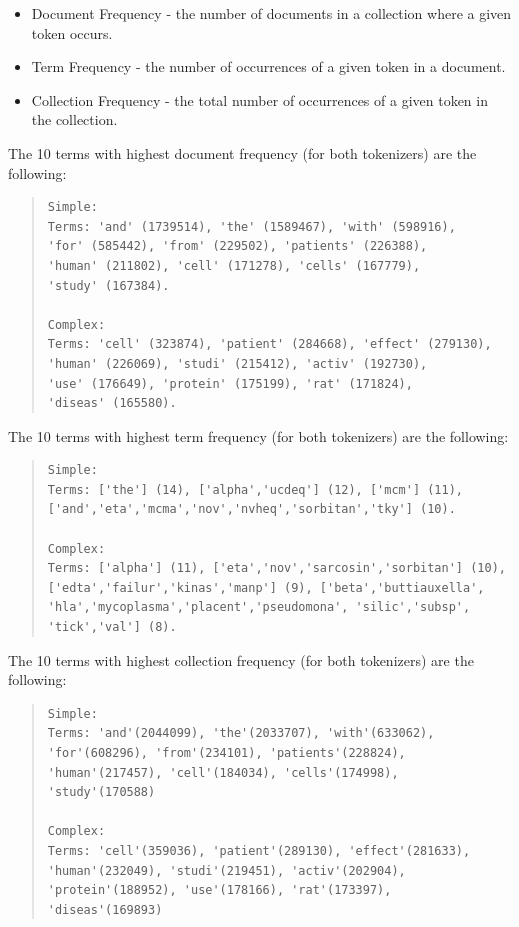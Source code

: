 \documentclass[12pt]{article}
\begin{document}
\begin{itemize}[leftmargin=*]
\setlength\itemsep{-0.3em}
\item Document Frequency - the number of documents in a collection where 
a given token occurs.
\item Term Frequency - the number of occurrences of a given token in a 
document.
\item Collection Frequency - the total number of occurrences of a given 
token in the collection.
\end{itemize}

The 10 terms with highest document frequency (for both tokenizers) are the 
following:

\begingroup
\addtolength\leftmargini{-0.4in}
\addtolength\baselineskip{-0.05in}
\begin{quote}
\begin{verbatim}
Simple:
Terms: 'and' (1739514), 'the' (1589467), 'with' (598916), 
'for' (585442), 'from' (229502), 'patients' (226388), 
'human' (211802), 'cell' (171278), 'cells' (167779), 
'study' (167384).

Complex:
Terms: 'cell' (323874), 'patient' (284668), 'effect' (279130),
'human' (226069), 'studi' (215412), 'activ' (192730),
'use' (176649), 'protein' (175199), 'rat' (171824),
'diseas' (165580).
\end{verbatim}
\end{quote}
\endgroup

The 10 terms with highest term frequency (for both tokenizers) are the 
following:

\begingroup
\addtolength\leftmargini{-0.4in}
\addtolength\baselineskip{-0.05in}
\begin{quote}
\begin{verbatim}
Simple:
Terms: ['the'] (14), ['alpha','ucdeq'] (12), ['mcm'] (11),
['and','eta','mcma','nov','nvheq','sorbitan','tky'] (10).

Complex:
Terms: ['alpha'] (11), ['eta','nov','sarcosin','sorbitan'] (10),
['edta','failur','kinas','manp'] (9), ['beta','buttiauxella',
'hla','mycoplasma','placent','pseudomona', 'silic','subsp',
'tick','val'] (8).
\end{verbatim}
\end{quote}
\endgroup

The 10 terms with highest collection frequency (for both tokenizers) are the 
following:

\begingroup
\addtolength\leftmargini{-0.4in}
\addtolength\baselineskip{-0.05in}
\begin{quote}
\begin{verbatim}
Simple:
Terms: 'and'(2044099), 'the'(2033707), 'with'(633062), 
'for'(608296), 'from'(234101), 'patients'(228824),
'human'(217457), 'cell'(184034), 'cells'(174998),
'study'(170588)

Complex:
Terms: 'cell'(359036), 'patient'(289130), 'effect'(281633),
'human'(232049), 'studi'(219451), 'activ'(202904),
'protein'(188952), 'use'(178166), 'rat'(173397),
'diseas'(169893)
\end{verbatim}
\end{quote}
\endgroup
\end{document}
